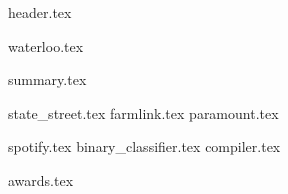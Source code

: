 \documentclass[11pt]{article}
\begin{document}
{header.tex}

{waterloo.tex}

{summary.tex}

{state_street.tex}
{farmlink.tex}
{paramount.tex}

{spotify.tex}
{binary_classifier.tex}
{compiler.tex}

{awards.tex}
\end{document}
